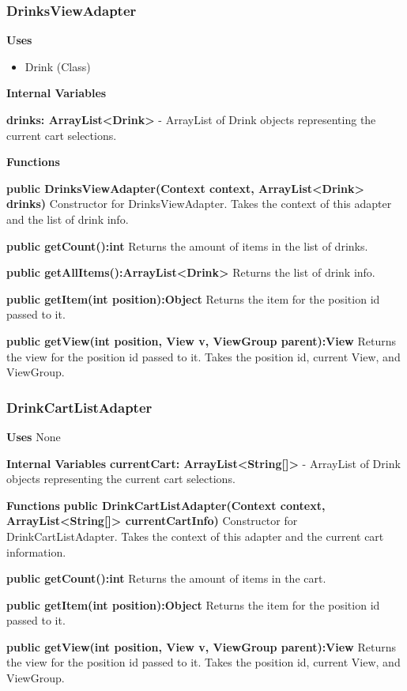 \documentclass [10pt]{article}
\begin{document}
\subsubsection{DrinksViewAdapter}

\textbf{Uses}

\begin{itemize}
	\item Drink (Class)
\end{itemize}

\textbf{Internal Variables}

\textbf{drinks: ArrayList<Drink>} - ArrayList of Drink objects representing the current cart selections.

\textbf{Functions}

\textbf{public DrinksViewAdapter(Context context, ArrayList<Drink> drinks)}
Constructor for DrinksViewAdapter. Takes the context of this adapter and the list of drink info.

\textbf{public getCount():int}
Returns the amount of items in the list of drinks.

\textbf{public getAllItems():ArrayList<Drink>}
Returns the list of drink info.

\textbf{public getItem(int position):Object}
Returns the item for the position id passed to it.

\textbf{public getView(int position, View v, ViewGroup parent):View}
Returns the view for the position id passed to it. Takes the position id, current View, and ViewGroup.

\subsubsection{DrinkCartListAdapter}

\textbf{Uses} None

\textbf{Internal Variables}
\textbf{currentCart: ArrayList<String[]>} - ArrayList of Drink objects representing the current cart selections.

\textbf{Functions}
\textbf{public DrinkCartListAdapter(Context context, ArrayList<String[]> currentCartInfo)}
Constructor for DrinkCartListAdapter. Takes the context of this adapter and the current cart information.

\textbf{public getCount():int}
Returns the amount of items in the cart.

\textbf{public getItem(int position):Object}
Returns the item for the position id passed to it.

\textbf{public getView(int position, View v, ViewGroup parent):View}
Returns the view for the position id passed to it. Takes the position id, current View, and ViewGroup.
\end{document}
